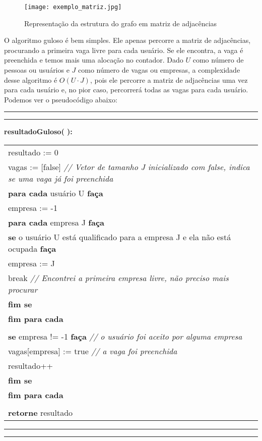 \documentclass[12pt]{article}
\begin{document}
		\begin{figure}[H]
			\centering
			\texttt{[image: exemplo\_matriz.jpg]}
			\caption{Representação da estrutura do grafo em matriz de adjacências}
			\label{exemplo_matriz}
		\end{figure}

		\par O algoritmo guloso é bem simples. Ele apenas percorre a matriz de adjacências, procurando a primeira vaga livre para cada usuário. Se ele encontra, a vaga é preenchida e temos mais uma alocação no contador. Dado $U$ como número de pessoas ou usuários e $J$ como número de vagas ou empresas, a complexidade desse algoritmo é $O(U \cdot J)$, pois ele percorre a matriz de adjacências uma vez para cada usuário e, no pior caso, percorrerá todas as vagas para cada usuário. Podemos ver o pseudocódigo abaixo:
		
		\vspace{12pt}
		\hrule
		\vspace{3pt}
		\hrule
		\noindent\textbf{resultadoGuloso( ):} \\
		\noindent\begin{tabular}{l}
			resultado := 0 \\
			vagas := [false] \footnotesize \textit{// Vetor de tamanho J inicializado com false, indica se uma vaga já foi preenchida} \\
			\textbf{para cada} usuário U \textbf{faça} \\
			\indent empresa := -1 \\
			\indent \textbf{para cada} empresa J \textbf{faça} \\
			\indent \indent \textbf{se} o usuário U está qualificado para a empresa J e ela não está ocupada \textbf{faça} \\
			\indent \indent \indent empresa := J \\
			\indent \indent \indent break \footnotesize \textit{// Encontrei a primeira empresa livre, não preciso mais procurar} \\
			\indent \indent \textbf{fim se} \\
			\indent \textbf{fim para cada} \\ \\
			\indent \textbf{se} empresa != -1 \textbf{faça} \footnotesize \textit{// o usuário foi aceito por alguma empresa} \\
			\indent \indent vagas[empresa] := true \footnotesize \textit{// a vaga foi preenchida} \\
			\indent \indent resultado++ \\
			\indent \textbf{fim se} \\
			\textbf{fim para cada} \\ \\
			\textbf{retorne} resultado
		\end{tabular}
		\hrule
		\vspace{3pt}
		\hrule
		\vspace{12pt}
\end{document}
